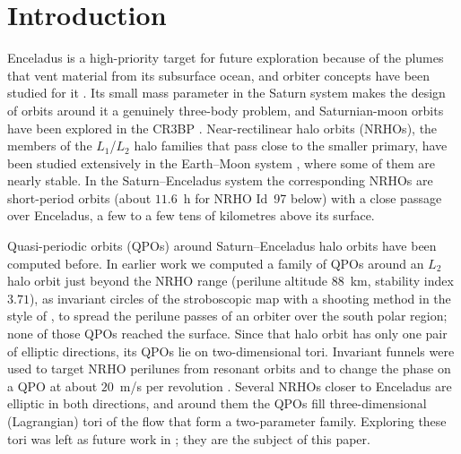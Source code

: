 \documentclass[11pt]{article}
\begin{document}
\section{Introduction}\label{sec:intro}

Enceladus is a high-priority target for future exploration because of the plumes that vent
material from its subsurface ocean, and orbiter concepts have been studied for it
\cite{cable2021enceladus}. Its small mass parameter in the Saturn system makes the design of
orbits around it a genuinely three-body problem, and Saturnian-moon orbits have been explored in
the CR3BP \cite{davis2018saturnian}. Near-rectilinear halo orbits (NRHOs), the members of the
$L_1$/$L_2$ halo families that pass close to the smaller primary, have been studied extensively in
the Earth--Moon system \cite{zimovan2017nrho,zimovanspreen2020,whitley2016options}, where some of
them are nearly stable. In the Saturn--Enceladus system the corresponding NRHOs are short-period
orbits (about $11.6$~h for NRHO Id~97 below) with a close passage over Enceladus, a few to a few
tens of kilometres above its surface.

Quasi-periodic orbits (QPOs) around Saturn--Enceladus halo orbits have been computed before. In earlier
work \cite{blanchard2023qpo,blanchard2024thesis} we computed a family of QPOs around an $L_2$
halo orbit just beyond the NRHO range (perilune altitude $88$~km, stability index $3.71$), as
invariant circles of the stroboscopic map with a shooting method in the style of
\cite{olikara2016computation}, to spread the perilune passes of an orbiter over the south polar
region; none of those QPOs reached the surface. Since that halo orbit has only one pair of
elliptic directions, its QPOs lie on two-dimensional tori. Invariant funnels were used to target
NRHO perilunes from resonant orbits \cite{blanchard2023funnels} and to change the phase on a QPO
at about $20$~m/s per revolution \cite{blanchard2024thesis}. Several NRHOs closer to Enceladus
are elliptic in both directions, and around them the QPOs fill three-dimensional (Lagrangian) tori
of the flow that form a two-parameter family. Exploring these tori was left as future work in
\cite{blanchard2024thesis}; they are the subject of this paper.
\end{document}
